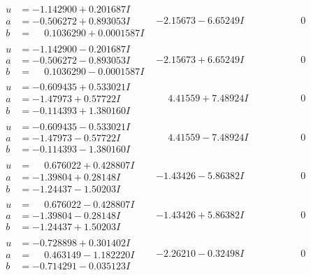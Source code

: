 \documentclass[1p]{elsarticle_modified}
\theoremstyle{definition}
\begin{document}
$$\begin{array}{c|c|c}
\begin{aligned}
u &= -1.142900 + 0.201687 I \\
a &= -0.506272 + 0.893053 I \\
b &= \phantom{-}0.1036290 + 0.0001587 I\end{aligned}
 & -2.15673 - 6.65249 I & \phantom{-0.000000 } 0 \\ \hline\begin{aligned}
u &= -1.142900 - 0.201687 I \\
a &= -0.506272 - 0.893053 I \\
b &= \phantom{-}0.1036290 - 0.0001587 I\end{aligned}
 & -2.15673 + 6.65249 I & \phantom{-0.000000 } 0 \\ \hline\begin{aligned}
u &= -0.609435 + 0.533021 I \\
a &= -1.47973 + 0.57722 I \\
b &= -0.114393 + 1.380160 I\end{aligned}
 & \phantom{-}4.41559 + 7.48924 I & \phantom{-0.000000 } 0 \\ \hline\begin{aligned}
u &= -0.609435 - 0.533021 I \\
a &= -1.47973 - 0.57722 I \\
b &= -0.114393 - 1.380160 I\end{aligned}
 & \phantom{-}4.41559 - 7.48924 I & \phantom{-0.000000 } 0 \\ \hline\begin{aligned}
u &= \phantom{-}0.676022 + 0.428807 I \\
a &= -1.39804 + 0.28148 I \\
b &= -1.24437 - 1.50203 I\end{aligned}
 & -1.43426 - 5.86382 I & \phantom{-0.000000 } 0 \\ \hline\begin{aligned}
u &= \phantom{-}0.676022 - 0.428807 I \\
a &= -1.39804 - 0.28148 I \\
b &= -1.24437 + 1.50203 I\end{aligned}
 & -1.43426 + 5.86382 I & \phantom{-0.000000 } 0 \\ \hline\begin{aligned}
u &= -0.728898 + 0.301402 I \\
a &= \phantom{-}0.463149 - 1.182220 I \\
b &= -0.714291 - 0.035123 I\end{aligned}
 & -2.26210 - 0.32498 I & \phantom{-0.000000 } 0 \\ \hline\begin{aligned}

\end{aligned}
\end{array}$$
\end{document}
